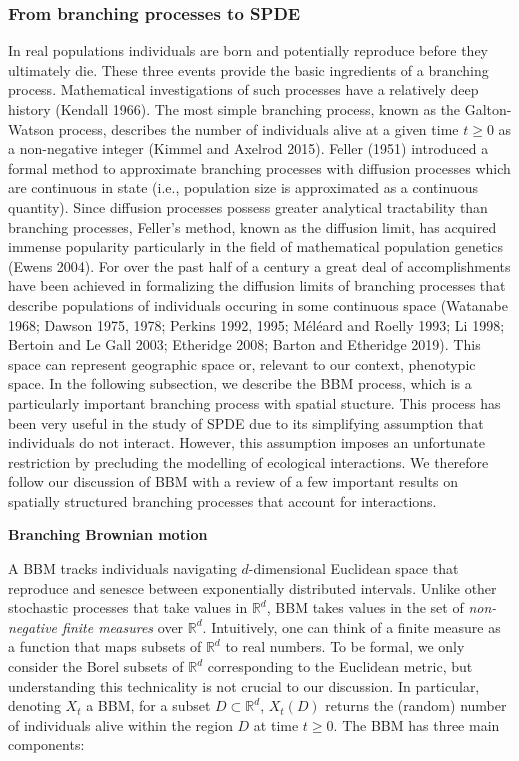 \documentclass[]{article}
\begin{document}
\hypertarget{from-branching-processes-to-spde}{%
\subsubsection{\texorpdfstring{From branching processes to SPDE
\label{stochastic}}{From branching processes to SPDE }}\label{from-branching-processes-to-spde}}

In real populations individuals are born and potentially reproduce
before they ultimately die. These three events provide the basic
ingredients of a branching process. Mathematical investigations of such
processes have a relatively deep history (Kendall 1966). The most simple
branching process, known as the Galton-Watson process, describes the
number of individuals alive at a given time \(t\geq0\) as a non-negative
integer (Kimmel and Axelrod 2015). Feller (1951) introduced a formal
method to approximate branching processes with diffusion processes which
are continuous in state (i.e., population size is approximated as a
continuous quantity). Since diffusion processes possess greater
analytical tractability than branching processes, Feller's method, known
as the diffusion limit, has acquired immense popularity particularly in
the field of mathematical population genetics (Ewens 2004). For over the
past half of a century a great deal of accomplishments have been
achieved in formalizing the diffusion limits of branching processes that
describe populations of individuals occuring in some continuous space
(Watanabe 1968; Dawson 1975, 1978; Perkins 1992, 1995; Méléard and
Roelly 1993; Li 1998; Bertoin and Le Gall 2003; Etheridge 2008; Barton
and Etheridge 2019). This space can represent geographic space or,
relevant to our context, phenotypic space. In the following subsection,
we describe the BBM process, which is a particularly important branching
process with spatial stucture. This process has been very useful in the
study of SPDE due to its simplifying assumption that individuals do not
interact. However, this assumption imposes an unfortunate restriction by
precluding the modelling of ecological interactions. We therefore follow
our discussion of BBM with a review of a few important results on
spatially structured branching processes that account for interactions.

\textbf{Branching Brownian motion}

A BBM tracks individuals navigating \(d\)-dimensional Euclidean space
that reproduce and senesce between exponentially distributed intervals.
Unlike other stochastic processes that take values in \(\mathbb{R}^d\),
BBM takes values in the set of \emph{non-negative finite measures} over
\(\mathbb{R}^d\). Intuitively, one can think of a finite measure as a
function that maps subsets of \(\mathbb{R}^d\) to real numbers. To be
formal, we only consider the Borel subsets of \(\mathbb{R}^d\)
corresponding to the Euclidean metric, but understanding this
technicality is not crucial to our discussion. In particular, denoting
\(X_t\) a BBM, for a subset \(D\subset\mathbb{R}^d\), \(X_t(D)\) returns
the (random) number of individuals alive within the region \(D\) at time
\(t\geq0\). The BBM has three main components:
\end{document}
